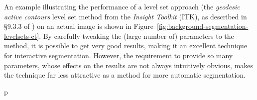 An example illustrating the performance of a level set approach (the \emph{geodesic active contours} level set method from the \emph{Insight Toolkit} (ITK), as described in \S9.3.3 of \cite{itk}) on an actual image is shown in Figure~\ref{fig:background-segmentation-levelsets-ct}. By carefully tweaking the (large number of) parameters to the method, it is possible to get very good results, making it an excellent technique for interactive segmentation. However, the requirement to provide so many parameters, whose effects on the results are not always intuitively obvious, makes the technique far less attractive as a method for more automatic segmentation.


\begin{stusubfig}{p}
	\hspace{4mm}%
	\\

\end{stusubfig}
